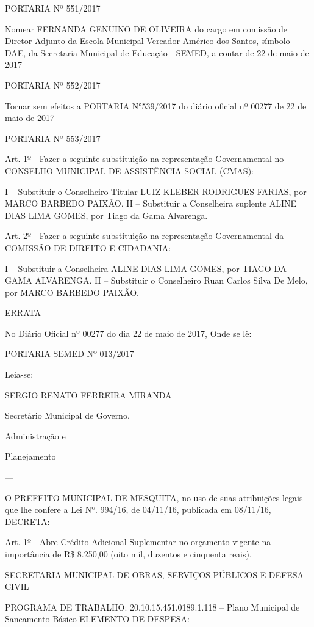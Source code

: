 \documentclass{doliberto}
\begin{document}
PORTARIA Nº 551/2017 
 
Nomear FERNANDA GENUINO DE OLIVEIRA do cargo em 
comissão  de  Diretor  Adjunto  da  Escola  Municipal 
Vereador  Américo  dos  Santos,  símbolo  DAE,  da 
Secretaria Municipal de Educação - SEMED, a contar de 22 
de maio de 2017 
 
PORTARIA Nº 552/2017 
 
Tornar  sem  efeitos  a  PORTARIA  N°539/2017  do  diário 
oficial nº 00277 de 22 de maio de 2017 
 
PORTARIA Nº 553/2017 
 
Art. 1º - Fazer a seguinte substituição na representação 
Governamental no CONSELHO MUNICIPAL DE 
ASSISTÊNCIA SOCIAL (CMAS):  
 
I – Substituir o Conselheiro Titular LUIZ KLEBER 
RODRIGUES FARIAS, por MARCO BARBEDO PAIXÃO.  
II – Substituir a Conselheira suplente ALINE DIAS LIMA 
GOMES, por Tiago da Gama Alvarenga. 
 
Art. 2º - Fazer a seguinte substituição na representação 
Governamental da COMISSÃO DE DIREITO E CIDADANIA: 
 
I – Substituir a Conselheira ALINE DIAS LIMA GOMES, por 
TIAGO DA GAMA ALVARENGA. 
II – Substituir o Conselheiro Ruan Carlos Silva De Melo, 
por MARCO BARBEDO PAIXÃO. 

 

ERRATA  
 
No Diário Oficial nº 00277 do dia 22 de maio de 2017, 
Onde se lê: 

PORTARIA SEMED Nº 013/2017 

Leia-se: 

 

SERGIO RENATO FERREIRA MIRANDA 

Secretário Municipal de Governo, 

Administração e 

Planejamento 

---

O  PREFEITO  MUNICIPAL  DE  MESQUITA,  no  uso  de  suas 
atribuições  legais  que  lhe  confere  a  Lei  Nº.  994/16,  de 
04/11/16, publicada em 08/11/16, DECRETA: 
 
Art. 1º - Abre Crédito Adicional Suplementar no orçamento 
vigente na importância de R\$ 8.250,00 (oito mil, duzentos e 
cinquenta reais). 
 
SECRETARIA MUNICIPAL DE OBRAS, SERVIÇOS PÚBLICOS E 
DEFESA CIVIL 
 
PROGRAMA DE TRABALHO: 
20.10.15.451.0189.1.118 – Plano Municipal de Saneamento 
Básico 
ELEMENTO DE DESPESA: 
\end{document}
